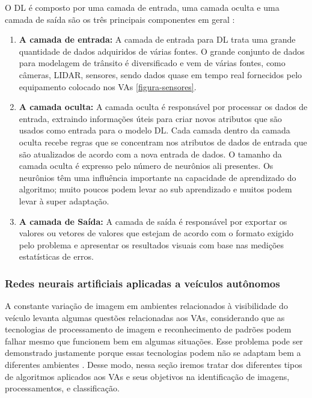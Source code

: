 O DL é composto por uma camada de entrada, uma camada oculta e uma camada de saída são os três principais componentes em geral \cite{software-ia}:

\begin{enumerate}
 \item \textbf{A camada de entrada:} A camada de entrada para DL trata uma grande quantidade de dados adquiridos de várias fontes. O grande conjunto de dados para modelagem de trânsito é diversificado e vem de várias fontes, como câmeras, LIDAR, sensores, sendo dados quase em tempo real fornecidos pelo equipamento colocado nos VAs \ref{figura-sensores}.
\item \textbf{A camada oculta:} A camada oculta é responsável por processar os dados de entrada, extraindo informações úteis para criar novos atributos que são usados como entrada para o modelo DL. Cada camada dentro da camada oculta recebe regras que se concentram nos atributos de dados de entrada que são atualizados de acordo com a nova entrada de dados. O tamanho da camada oculta é expresso pelo número de neurônios ali presentes. Os neurônios têm uma influência importante na capacidade de aprendizado do algoritmo; muito poucos podem levar ao sub aprendizado e muitos podem levar à super adaptação.
\item \textbf{A camada de Saída:} A camada de saída é responsável por exportar os valores ou vetores de valores que estejam de acordo com o formato exigido pelo problema e apresentar os resultados visuais com base nas medições estatísticas de erros.
\end{enumerate}

\subsubsection{Redes neurais artificiais aplicadas a veículos autônomos}

A constante variação de imagem em ambientes relacionados à visibilidade do veículo levanta algumas questões relacionadas aos VAs, considerando que as tecnologias de processamento de imagem e reconhecimento de padrões podem falhar mesmo que funcionem bem em algumas situações. Esse problema pode ser demonstrado justamente porque essas tecnologias podem não se adaptam bem a diferentes ambientes \cite{caio}.
Desse modo, nessa seção iremos tratar dos diferentes tipos de algoritmos aplicados aos VAs e seus objetivos na identificação de imagens, processamentos, e classificação.


